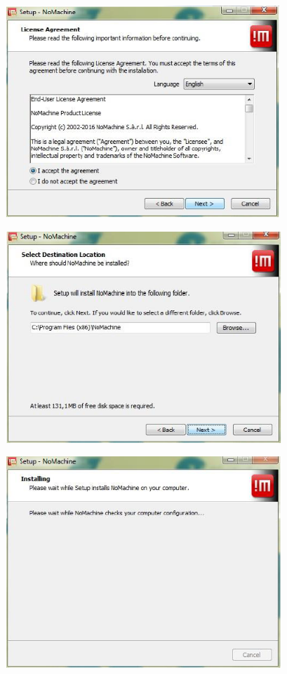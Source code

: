 \documentclass[]{book}
\begin{document}
\includegraphics[width=4.06374in,height=3.14961in]{./media/image21.png}

\includegraphics[width=4.09365in,height=3.14961in]{./media/image22.png}

\includegraphics[width=4.09365in,height=3.14961in]{./media/image23.png}
\end{document}

